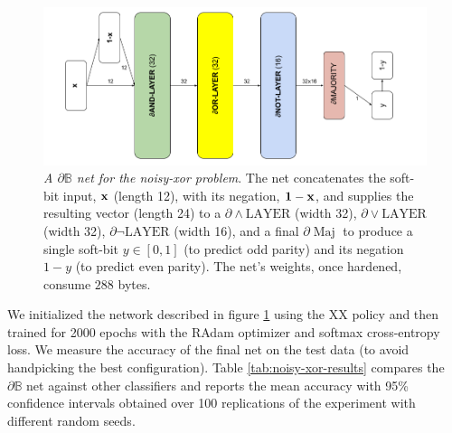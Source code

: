 \documentclass{article} %
\begin{document}
\begin{figure}[t]
	\centering
	\includegraphics[width=1.0\textwidth]{noisy-xor-architecture.png}
	\caption{{\em A $\partial\mathbb{B}$ net for the noisy-xor problem}. The net concatenates the soft-bit input, ${\bf x}$ (length 12), with its negation, ${\bf 1 - x}$, and supplies the resulting vector (length 24) to a $\partial\!\wedge\!\text{LAYER}$ (width 32), $\partial\!\vee\!\text{LAYER}$ (width 32),  $\partial \neg \text{LAYER}$ (width 16), and a final $\partial\!\operatorname{Maj}$ to produce a single soft-bit $y \in [0,1]$ (to predict odd parity) and its negation $1-y$ (to predict even parity). The net's weights, once hardened, consume $288$ bytes.}
	\label{fig:noisy-xor-architecture}
\end{figure}

We initialized the network described in figure \ref{fig:noisy-xor-architecture} using the XX policy and then trained for 2000 epochs with the RAdam optimizer \citep{Liu2020On} and softmax cross-entropy loss. We measure the accuracy of the final net on the test data (to avoid handpicking the best configuration). Table \ref{tab:noisy-xor-results} compares the $\partial\mathbb{B}$ net against other classifiers \citep{granmo18} and reports the mean accuracy with 95\% confidence intervals obtained over 100 replications of the experiment with different random seeds. 
\end{document}
